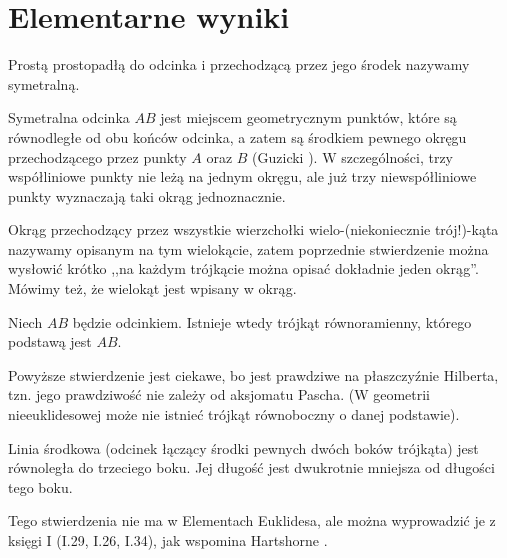 \section{Elementarne wyniki}

\begin{definition}[symetralna]
	Prostą prostopadłą do odcinka i przechodzącą przez jego środek nazywamy symetralną.
\end{definition}

Symetralna odcinka $AB$ jest miejscem geometrycznym punktów, które są równodległe od obu końców odcinka, a zatem są środkiem pewnego okręgu przechodzącego przez punkty $A$ oraz $B$ (Guzicki \cite[s. 14, 15]{guzicki_2021}).
W szczególności, trzy współliniowe punkty nie leżą na jednym okręgu, ale już trzy niewspółliniowe punkty wyznaczają taki okrąg jednoznacznie.

Okrąg przechodzący przez wszystkie wierzchołki wielo-(niekoniecznie trój!)-kąta nazywamy opisanym na tym wielokącie, zatem poprzednie stwierdzenie można wysłowić krótko ,,na każdym trójkącie można opisać dokładnie jeden okrąg''.
Mówimy też, że wielokąt jest wpisany w okrąg.
%


\begin{proposition}
	\label{hartshorne_52x}
    Niech $AB$ będzie odcinkiem.
	Istnieje wtedy trójkąt równoramienny, którego podstawą jest $AB$.
\end{proposition}

Powyższe stwierdzenie jest ciekawe, bo jest prawdziwe na płaszczyźnie Hilberta, tzn. jego prawdziwość nie zależy od aksjomatu Pascha.
(W geometrii nieeuklidesowej może nie istnieć trójkąt równoboczny o danej podstawie).

\begin{proposition}
	\label{hartshorne_52}
	Linia środkowa (odcinek łączący środki pewnych dwóch boków trójkąta) jest równoległa do trzeciego boku.
    Jej długość jest dwukrotnie mniejsza od długości tego boku.
\end{proposition}

Tego stwierdzenia nie ma w Elementach Euklidesa, ale można wyprowadzić je z księgi I (I.29, I.26, I.34), jak wspomina Hartshorne \cite[s. 45, 52. 53]{hartshorne2000}.

